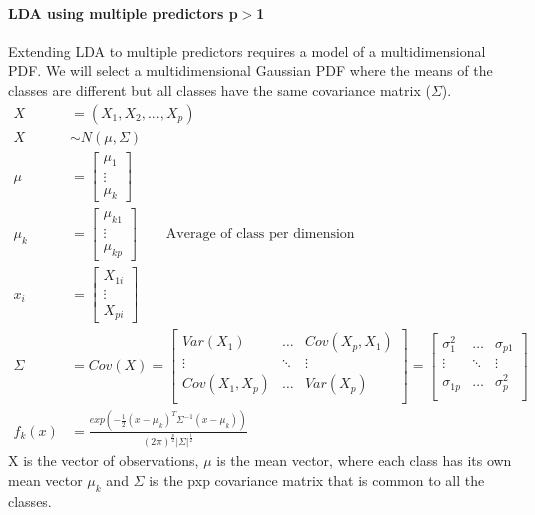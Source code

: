 \documentclass[../document.tex]{subfiles}
\begin{document}
	\sectionbreak
	\paragraph{LDA using multiple predictors p\(>\)1}
	Extending LDA to multiple predictors requires a model of a multidimensional PDF. We will select a multidimensional Gaussian PDF where the means of the classes are different but all classes have the same covariance matrix ($\Sigma$).
	\begin{equation}
	\begin{split}
		X&=(X_{1},X_{2},...,X_{p})\\
		X&\sim N(\mu,\Sigma)\\
		\mu&= \left[\begin{matrix}\mu_{1} \\ \vdots \\ \mu_{k} \end{matrix}\right]\\
		\mu_k &= \left[\begin{matrix}\mu_{k1} \\ \vdots \\ \mu_{kp} \end{matrix}\right] \qquad \text{Average of class per dimension}\\
		x_i&=\left[\begin{matrix}X_{1i} \\ \vdots \\ X_{pi} \end{matrix}\right]\\
		\Sigma&=Cov(X)=\left[\begin{matrix}
				Var(X_1) &\dots& Cov(X_p, X_1)\\
				\vdots & \ddots & \vdots\\
				Cov(X_1, X_p) &\dots & Var(X_p)\\
			\end{matrix}\right]=\left[\begin{matrix}
				\sigma^2_1 &\dots& \sigma_{p1}\\
				\vdots & \ddots & \vdots\\
				\sigma_{1p} &\dots & \sigma^2_p\\
			\end{matrix}\right]\\
		f_k(x)&=\frac{exp(-\frac{1}{2}(x-\mu_k)^T\Sigma^{-1}(x-\mu_k))}{(2\pi)^\frac{p}{2}|\Sigma|^\frac{1}{2}}
	\end{split}
	\end{equation}
	X is the vector of observations, \(\mu\) is the mean vector, where each class has its own mean vector \(\mu_{k}\) and \(\Sigma\) is the pxp covariance matrix that is common to all the classes.
\end{document}
